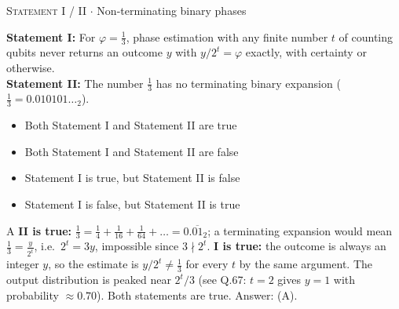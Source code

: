 \documentclass[11pt,a4paper]{article}
\newcommand{\optlabel}[1]{\textbf{(#1)}}
\newcommand{\correctlabel}[1]{\textcolor{okgreen}{\textbf{(#1)}\,\ding{51}}}
\newenvironment{qitem}[1]{\begin{list}{}{\setlength{\leftmargin}{3.3em}\setlength{\labelwidth}{3.1em}%
  \setlength{\labelsep}{0.2em}\setlength{\topsep}{3pt}\setlength{\parsep}{3pt}}\item[\textbf{Q.#1}\hfill]}{\end{list}}
\newcommand{\qsep}{\par\vspace{2pt}{\color{black!15}\hrule}\vspace{4pt}}
\newcommand{\qmeta}[2]{{\footnotesize\color{black!60}\textsc{#1} \;$\cdot$\; #2}\par}
\begin{document}
\begin{qitem}{78}
\qmeta{Statement I / II}{Non-terminating binary phases}
\textbf{Statement I:} For $\varphi = \frac13$, phase estimation with any finite number $t$ of counting qubits never returns an
outcome $y$ with $y/2^t = \varphi$ exactly, with certainty or otherwise.\\[1mm]
\textbf{Statement II:} The number $\frac13$ has no terminating binary expansion ($\frac13 = 0.010101\ldots_2$).
\begin{itemize}[leftmargin=2.6em, labelsep=0.4em, itemsep=2pt, topsep=3pt]
\item[\correctlabel{A}] Both Statement I and Statement II are true
\item[\optlabel{B}] Both Statement I and Statement II are false
\item[\optlabel{C}] Statement I is true, but Statement II is false
\item[\optlabel{D}] Statement I is false, but Statement II is true
\end{itemize}
\end{qitem}
\begin{solbox}{A}
\textbf{II is true:} $\frac13 = \frac14 + \frac1{16} + \frac1{64} + \dots = 0.\overline{01}_2$; a terminating expansion would mean
$\frac13 = \frac{y}{2^t}$, i.e.\ $2^t = 3y$, impossible since $3 \nmid 2^t$. \textbf{I is true:} the outcome is always an integer
$y$, so the estimate is $y/2^t \ne \frac13$ for every $t$ by the same argument. The output distribution is peaked near
$2^t/3$ (see Q.67: $t = 2$ gives $y = 1$ with probability $\approx 0.70$). Both statements are true. Answer: (A).
\end{solbox}
\qsep
\end{document}
